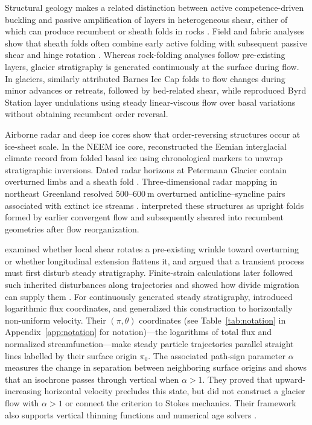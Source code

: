 \documentclass[review]{igs}
\begin{document}
Structural geology makes a related distinction between active competence-driven buckling and passive amplification of layers in heterogeneous shear, either of which can produce recumbent or sheath folds in rocks \citep{Bastida2014,SchmalholzMancktelow2016,NabaviFossen2021}. Field and fabric analyses show that sheath folds often combine early active folding with subsequent passive shear and hinge rotation \citep{Fazio2024,AlsopCondon2025}. Whereas rock-folding analyses follow pre-existing layers, glacier stratigraphy is generated continuously at the surface during flow. In glaciers, \citet{Hudleston1976} similarly attributed Barnes Ice Cap folds to flow changes during minor advances or retreats, followed by bed-related shear, while \citet{WhillansJohnsen1983} reproduced Byrd Station layer undulations using steady linear-viscous flow over basal variations without obtaining recumbent order reversal.

Airborne radar and deep ice cores show that order-reversing structures occur at ice-sheet scale. In the NEEM ice core, \citet{DahlJensen2013} reconstructed the Eemian interglacial climate record from folded basal ice using chronological markers to unwrap stratigraphic inversions. Dated radar horizons at Petermann Glacier contain overturned limbs and a sheath fold \citep{Bons2016}. Three-dimensional radar mapping in northeast Greenland resolved \(500\)--\(600~\mathrm{m}\) overturned anticline--syncline pairs associated with extinct ice streams \citep{Franke2022}. \citet{Franke2022} interpreted these structures as upright folds formed by earlier convergent flow and subsequently sheared into recumbent geometries after flow reorganization.

\citet{Waddington2001} examined whether local shear rotates a pre-existing wrinkle toward overturning or whether longitudinal extension flattens it, and argued that a transient process must first disturb steady stratigraphy. Finite-strain calculations later followed such inherited disturbances along trajectories and showed how divide migration can supply them \citep{JacobsonWaddington2004,JacobsonWaddington2005}. For continuously generated steady stratigraphy, \citet{ParreninHindmarshRemy2006} introduced logarithmic flux coordinates, and \citet{ParreninHindmarsh2007} generalized this construction to horizontally non-uniform velocity. Their \((\pi,\theta)\) coordinates (see Table~\ref{tab:notation} in Appendix~\ref{app:notation} for notation)---the logarithms of total flux and normalized streamfunction---make steady particle trajectories parallel straight lines labelled by their surface origin \(\pi_0\). The associated path-sign parameter \(\alpha\) measures the change in separation between neighboring surface origins and shows that an isochrone passes through vertical when \(\alpha>1\). They proved that upward-increasing horizontal velocity precludes this state, but did not construct a glacier flow with \(\alpha>1\) or connect the criterion to Stokes mechanics. Their framework also supports vertical thinning functions and numerical age solvers \citep{Parrenin2013,HindmarshLeysingerVieliParrenin2009,ParreninChungMartin2025}.
\end{document}
